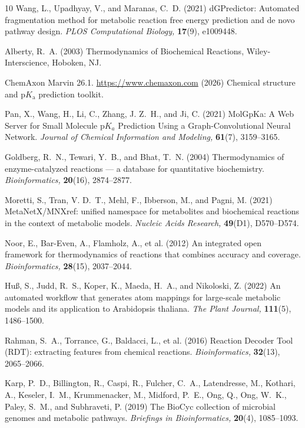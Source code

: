 \documentclass[unnumsec,webpdf,modern,large]{oup-authoring-template}
\begin{document}
\begin{thebibliography}{10}
Wang, L., Upadhyay, V., and Maranas, C.~D. (2021)
{dGPredictor}: Automated fragmentation method for metabolic reaction free
  energy prediction and de novo pathway design.
{\em PLOS Computational Biology,} {\bf 17}(9), e1009448.

Alberty, R.~A. (2003)
Thermodynamics of Biochemical Reactions,
Wiley-Interscience, Hoboken, NJ.

{ChemAxon}
{Marvin} 26.1.
\url{https://www.chemaxon.com} (2026)
Chemical structure and p$K_\mathrm{a}$ prediction toolkit.

Pan, X., Wang, H., Li, C., Zhang, J. Z.~H., and Ji, C. (2021)
{MolGpKa}: A Web Server for Small Molecule $\mathrm{p}K_a$ Prediction Using a
  Graph-Convolutional Neural Network.
{\em Journal of Chemical Information and Modeling,} {\bf 61}(7), 3159--3165.

Goldberg, R.~N., Tewari, Y.~B., and Bhat, T.~N. (2004)
Thermodynamics of enzyme-catalyzed reactions --- a database for quantitative
  biochemistry.
{\em Bioinformatics,} {\bf 20}(16), 2874--2877.

Moretti, S., Tran, V. D.~T., Mehl, F., Ibberson, M., and Pagni, M. (2021)
{MetaNetX/MNXref}: unified namespace for metabolites and biochemical reactions
  in the context of metabolic models.
{\em Nucleic Acids Research,} {\bf 49}(D1), D570--D574.

Noor, E., Bar-Even, A., Flamholz, A., et al. (2012)
An integrated open framework for thermodynamics of reactions that combines
  accuracy and coverage.
{\em Bioinformatics,} {\bf 28}(15), 2037--2044.

Hu{\ss}, S., Judd, R.~S., Koper, K., Maeda, H.~A., and Nikoloski, Z. (2022)
An automated workflow that generates atom mappings for large-scale metabolic
  models and its application to {A}rabidopsis thaliana.
{\em The Plant Journal,} {\bf 111}(5), 1486--1500.

Rahman, S.~A., Torrance, G., Baldacci, L., et al. (2016)
Reaction Decoder Tool ({RDT}): extracting features from chemical reactions.
{\em Bioinformatics,} {\bf 32}(13), 2065--2066.

Karp, P.~D., Billington, R., Caspi, R., Fulcher, C.~A., Latendresse, M.,
  Kothari, A., Keseler, I.~M., Krummenacker, M., Midford, P.~E., Ong, Q., Ong,
  W.~K., Paley, S.~M., and Subhraveti, P. (2019)
The {BioCyc} collection of microbial genomes and metabolic pathways.
{\em Briefings in Bioinformatics,} {\bf 20}(4), 1085--1093.


\end{thebibliography}
\end{document}
